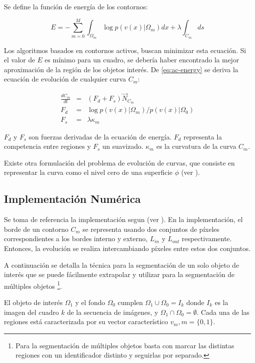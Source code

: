 \documentclass[a4paper,10pt]{article}
\begin{document}
Se define la función de energía de los contornos:

\begin{equation}
    \label{eq:ac-energy}
    E = - \sum_{m=0}^{M}{\int_{\Omega_m}{\log{p(v(x) \vert \Omega_m)} dx} + \lambda \int_{C_m}{ds}}
\end{equation}

Los algoritmos basados en contornos activos, buscan minimizar esta ecuación. Si el valor de $E$ es mínimo para un cuadro, se
debería haber encontrado la mejor aproximación de la región de los objetos interés. De \ref{eq:ac-energy} se
deriva la ecuación de evolución de cualquier curva $C_m$:

\begin{eqnarray}
    \frac{dC_m}{dt} &=& (F_d + F_s) \overrightarrow{N}_{C_m} \\
    F_d &=& \log{p(v(x) \vert \Omega_m) / p(v(x) \vert \Omega_0)} \\
    F_s &=& \lambda \kappa_m \label{eq:ac-formal}
\end{eqnarray}

$F_d$ y $F_s$ son fuerzas derivadas de la ecuación de energía. $F_d$ representa la competencia entre regiones y $F_s$ un
suavizado. $\kappa_m$ es la curvatura de la curva $C_m$.

Existe otra formulación del problema de evolución de curvas, que consiste en
representar la curva como el nivel cero de una superficie $\phi$ (ver \cite{Osher88}).

\subsection{Implementación Numérica}

Se toma de referencia la implementación segun \citeauthor{fast-level-set} (ver \cite{fast-level-set}).
En la implementación, el borde de un contorno $C_m$ se representa usando dos conjuntos de píxeles
correspondientes a los bordes interno y externo, $L_{in}$ y $L_{out}$
respectivamente. Entonces, la evolución se realiza intercambiando píxeles entre
estos dos conjuntos.

A continuación se detalla la técnica para la segmentación de un solo objeto de
interés que se puede fácilmente extrapolar y utilizar para la
segmentación de múltiples objetos
\footnote{Para la segmentación de múltiples objetos basta con marcar las distintas regiones con un identificador
distinto y seguirlas por separado.}.

El objeto de interés $\Omega_{1}$ y el fondo $\Omega_{0}$ cumplen
$\Omega_{1}\cup\Omega_{0} = I_{k}$ donde $I_{k}$ es la imagen del cuadro $k$ de
la secuencia de imágenes, y $\Omega_{1}\cap\Omega_{0} = \emptyset$. Cada una de
las regiones está caracterizada por su vector característico $v_{m}, m =
\{0,1\}$.
\end{document}
